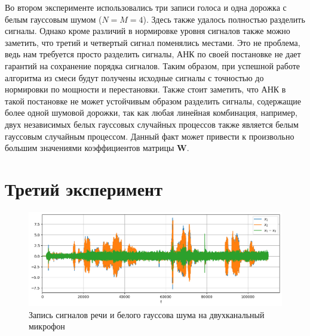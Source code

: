\documentclass[a4paper,12pt]{article}
\begin{document}
	Во втором эксперименте использовались три записи голоса и одна дорожка с белым гауссовым шумом ($N=M=4$). Здесь также удалось полностью разделить сигналы. Однако кроме различий в нормировке уровня сигналов также можно заметить, что третий и четвертый сигнал поменялись местами. Это не проблема, ведь нам требуется просто разделить сигналы, АНК по своей постановке не дает гарантий на сохранение порядка сигналов. Таким образом, при успешной работе алгоритма из смеси будут получены исходные сигналы с точностью до нормировки по мощности и перестановки. Также стоит заметить, что АНК в такой постановке не может устойчивым образом разделить сигналы, содержащие более одной шумовой дорожки, так как любая линейная комбинация, например, двух независимых белых гауссовых случайных процессов также является белым гауссовым случайным процессом. Данный факт может привести к произвольно большим значениями коэффициентов матрицы $\mathbf{W}$.
	
	\newpage
	\section*{Третий эксперимент}
	
	\begin{figure}[h!]
		\centering
		\includegraphics[width=0.6\linewidth]{plots/signal3}
		\caption{Запись сигналов речи и белого гауссова шума на двухканальный микрофон}
	\end{figure}
	
\end{document}
